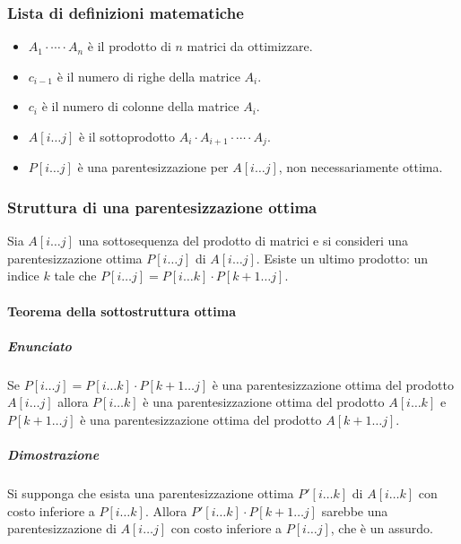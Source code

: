 \subsubsection{Lista di definizioni matematiche}
\begin{itemize}
	\item $A_1\cdot\cdots\cdot A_n$ \`e il prodotto di $n$ matrici da ottimizzare.
	\item $c_{i-1}$ \`e il numero di righe della matrice $A_i$.
	\item $c_i$ \`e il numero di colonne della matrice $A_i$.
	\item $A[i\dots j]$ \`e il sottoprodotto $A_i\cdot A_{i+1}\cdot\cdots\cdot A_j$.
	\item $P[i\dots j]$ \`e una parentesizzazione per $A[i\dots j]$, non necessariamente ottima. 
\end{itemize}
\subsubsection{Struttura di una parentesizzazione ottima}
Sia $A[i\dots j]$ una sottosequenza del prodotto di matrici e si consideri una parentesizzazione ottima $P[i\dots j]$ di $A[i\dots j]$. Esiste un ultimo
prodotto: un indice $k$ tale che $P[i\dots j] = P[i\dots k]\cdot P[k+1\dots j]$.
\paragraph{Teorema della sottostruttura ottima}
\subparagraph{Enunciato}
Se $P[i\dots j]=P[i\dots k]\cdot P[k+1\dots j]$ \`e una parentesizzazione ottima del prodotto $A[i\dots j]$ allora $P[i\dots k]$ \`e una parentesizzazione
ottima del prodotto $A[i\dots k]$ e $P[k+1\dots j]$ \`e una parentesizzazione ottima del prodotto $A[k+1\dots j]$. 
\subparagraph{Dimostrazione}
Si supponga che esista una parentesizzazione ottima $P'[i\dots k]$ di $A[i\dots k]$ con costo inferiore a $P[i\dots k]$. Allora $P'[i\dots k]\cdot 
P[k+1\dots j]$ sarebbe una parentesizzazione di $A[i\dots j]$ con costo inferiore a $P[i\dots j]$, che \`e un assurdo. 
